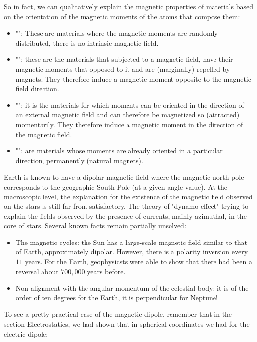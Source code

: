 	So in fact, we can qualitatively explain the magnetic properties of materials based on the orientation of the magnetic moments of the atoms that compose them:
	\begin{itemize}
		\item "": These are materials where the magnetic moments are randomly distributed, there is no intrinsic magnetic field.

		\item "": these are the materials that subjected to a magnetic field, have their magnetic moments that opposed to it and are (marginally)  repelled by magnets. They therefore induce a magnetic moment opposite to the magnetic field direction.
		
		\item "": it is the materials for which moments can be oriented in the direction of an external magnetic field and can therefore be magnetized so (attracted) momentarily. They therefore induce a magnetic moment in the direction of the magnetic field.

		\item "": are materials whose moments are already oriented in a particular direction, permanently (natural magnets).
	\end{itemize}
	\begin{tcolorbox}[title=Remark,colframe=black,arc=10pt]
	Earth is known to have a dipolar magnetic field where the magnetic north pole corresponds to the geographic South Pole (at a given angle value). At the macroscopic level, the explanation for the existence of the magnetic field observed on the stars is still far from satisfactory. The theory of "dynamo effect" trying to explain the fields observed by the presence of currents, mainly azimuthal, in the core of stars. Several known facts remain partially unsolved:
	\begin{itemize}
		\item The magnetic cycles: the Sun has a large-scale magnetic field similar to that of Earth, approximately dipolar. However, there is a polarity inversion every $11$ years. For the Earth, geophysicsts were able to show that there had been a reversal about $700,000$ years before.
		
		\item Non-alignment with the angular momentum of the celestial body: it is of the order of ten degrees for the Earth, it is perpendicular for Neptune!
	\end{itemize}
	\end{tcolorbox}
	To see a pretty practical case of the magnetic dipole, remember that in the section Electrostatics, we had shown that in spherical coordinates we had for the electric dipole:
	

